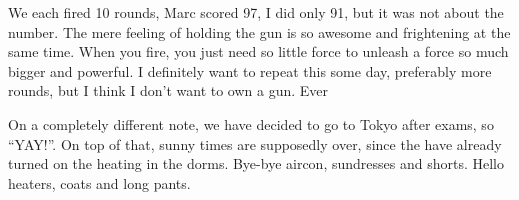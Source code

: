 \begin{post}
\begin{content}
We each fired 10 rounds, Marc scored 97, I did only 91, but it was not about the number. The mere feeling of holding the gun is so awesome and frightening at the same time. When you fire, you just need so little force to unleash a force so much bigger and powerful. I definitely want to repeat this some day, preferably more rounds, but I think I don't want to own a gun. Ever

On a completely different note, we have decided to go to Tokyo after exams, so ``YAY!''. On top of that, sunny times are supposedly over, since the have already turned on the heating in the dorms. Bye-bye aircon, sundresses and shorts. Hello heaters, coats and long pants.
	\end{content}
\end{post}
